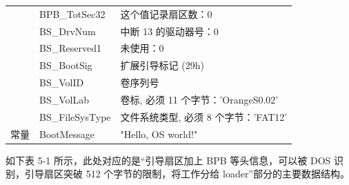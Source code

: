 \begin{table}[htbp]
\begin{center}
\begin{tabular}{|c|l|l|}
                                                                           & BPB\_TotSec32   & 这个值记录扇区数：0                  \\ \cline{2-3} 
                                                                           & BS\_DrvNum      & 中断 13 的驱动器号：0               \\ \cline{2-3} 
                                                                           & BS\_Reserved1   & 未使用：0                       \\ \cline{2-3} 
                                                                           & BS\_BootSig     & 扩展引导标记 (29h)                \\ \cline{2-3} 
                                                                           & BS\_VolID       & 卷序列号                        \\ \cline{2-3} 
                                                                           & BS\_VolLab      & 卷标, 必须 11 个字节：'OrangeS0.02' \\ \cline{2-3} 
                                                                           & BS\_FileSysType & 文件系统类型, 必须 8 个字节：'FAT12’    \\ \hline
常量                                                                         & BootMessage     & "Hello, OS world!"          \\ \hline
\end{tabular}
\end{center}
\end{table}
如下表 5-1 所示，此处对应的是“引导扇区加上 BPB 等头信息，可以被 DOS 识别，引导扇区突破 512 个字节的限制，将工作分给 loader”部分的主要数据结构。



